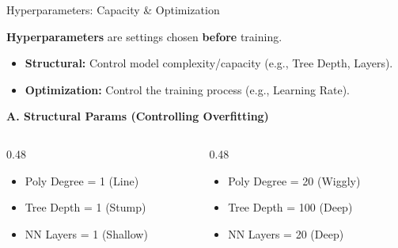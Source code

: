 \begin{frame}{Hyperparameters: Capacity \& Optimization}

    \begin{block}{}
        \textbf{Hyperparameters} are settings chosen \textbf{before} training.
        \begin{itemize}
            \item \textbf{Structural:} Control model complexity/capacity (e.g., Tree Depth, Layers).
            \item \textbf{Optimization:} Control the training process (e.g., Learning Rate).
        \end{itemize}
    \end{block}

    \vspace{0.5em}
    \centering
    
    \textbf{A. Structural Params (Controlling Overfitting)}
    \begin{columns}[T]
        \begin{column}{0.48\textwidth}
            \begin{tcolorbox}[colback=blue!5, colframe=blue!50, title=Rigid (Risk: Underfitting), fonttitle=\small, left=2pt, right=2pt]
                \footnotesize
                \begin{itemize}
                    \item Poly Degree = 1 (Line)
                    \item Tree Depth = 1 (Stump)
                    \item NN Layers = 1 (Shallow)
                \end{itemize}
            \end{tcolorbox}
        \end{column}
        
        \begin{column}{0.48\textwidth}
            \begin{tcolorbox}[colback=red!5, colframe=red!50, title=Flexible (Risk: Overfitting), fonttitle=\small, left=2pt, right=2pt]
                \footnotesize
                \begin{itemize}
                    \item Poly Degree = 20 (Wiggly)
                    \item Tree Depth = 100 (Deep)
                    \item NN Layers = 20 (Deep)
                \end{itemize}
            \end{tcolorbox}
        \end{column}
    \end{columns}
  

\end{frame}

